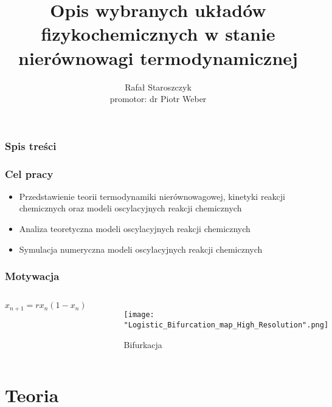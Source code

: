 \documentclass{beamer}
\title{Opis wybranych układów fizykochemicznych w stanie nierównowagi termodynamicznej}
\author{Rafał Staroszczyk\\\footnotesize promotor: dr Piotr Weber}
\institute{Politechnika Gdańska}
\date{}
\begin{document}
\beamertemplatenavigationsymbolsempty
{}

\begin{frame}
\titlepage
\end{frame}

\begin{frame}
\frametitle{Spis treści}
\tableofcontents
\end{frame}

\begin{frame}
\frametitle{Cel pracy}
\begin{itemize}
\item Przedstawienie teorii termodynamiki nierównowagowej, kinetyki reakcji chemicznych oraz modeli oscylacyjnych reakcji chemicznych
\item Analiza teoretyczna modeli oscylacyjnych reakcji chemicznych
\item Symulacja numeryczna modeli oscylacyjnych reakcji chemicznych
\end{itemize}
\end{frame}

\begin{frame}
\frametitle{Motywacja}
\begin{columns}
\begin{equation*}
x_{n+1}=rx_{n}\left(1-x_{n}\right)
\end{equation*}
\begin{figure}
\texttt{[image: "Logistic\_Bifurcation\_map\_High\_Resolution".png]}
\caption{Bifurkacja}
\end{figure}
\begin{figure}
 \\
\end{figure}
\end{columns}
\end{frame}

\section{Teoria}
\end{document}
